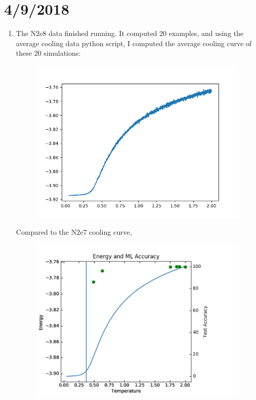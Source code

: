 \documentclass[12pt,reqno]{amsart}
\numberwithin{equation}{section}
\begin{document}
\section{4/9/2018}

\begin{enumerate}
\item The N2e8 data finished running.  It computed 20 examples, and using the average cooling data python script, I computed the average cooling curve of these 20 simulations:  

\begin{figure}[H]
\centering
\includegraphics[scale=0.6]{average_cooling_data_N2e8}
\end{figure}

Compared to the N2e7 cooling curve, 

\begin{figure}[H]
\centering
\includegraphics[scale=0.6]{accuracies-3-15-2018}
\end{figure}


\end{enumerate}
\end{document}
